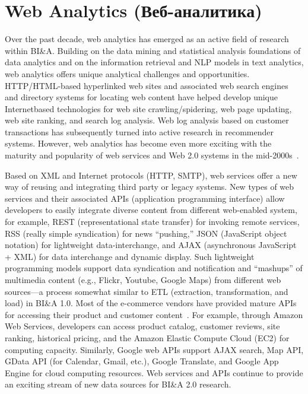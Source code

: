 \section{Web Analytics (Веб-аналитика)}

Over the past decade, web analytics has emerged as an active
field of research within BI\&A. Building on the data mining
and statistical analysis foundations of data analytics and on
the information retrieval and NLP models in text analytics,
web analytics offers unique analytical challenges and
opportunities. HTTP/HTML-based hyperlinked web sites and
associated web search engines and directory systems for
locating web content have helped develop unique Internetbased
technologies for web site crawling/spidering, web page
updating, web site ranking, and search log analysis. Web log
analysis based on customer transactions has subsequently
turned into active research in recommender systems. However,
web analytics has become even more exciting with the
maturity and popularity of web services and Web 2.0 systems
in the mid-2000s~\cite{OReilly:2005}. 

Based on XML and Internet protocols (HTTP, SMTP), web
services offer a new way of reusing and integrating third party
or legacy systems. New types of web services and their
associated APIs (application programming interface) allow
developers to easily integrate diverse content from different
web-enabled system, for example, REST (representational
state transfer) for invoking remote services, RSS (really
simple syndication) for news “pushing,” JSON (JavaScript
object notation) for lightweight data-interchange, and AJAX
(asynchronous JavaScript + XML) for data interchange and
dynamic display. Such lightweight programming models
support data syndication and notification and “mashups” of
multimedia content (e.g., Flickr, Youtube, Google Maps)
from different web sources—a process somewhat similar to
ETL (extraction, transformation, and load) in BI\&A 1.0.
Most of the e-commerce vendors have provided mature APIs
for accessing their product and customer content~\cite{Schonfeld:2005}. For example, through Amazon Web Services, developers
can access product catalog, customer reviews, site
ranking, historical pricing, and the Amazon Elastic Compute
Cloud (EC2) for computing capacity. Similarly, Google web
APIs support AJAX search, Map API, GData API (for
Calendar, Gmail, etc.), Google Translate, and Google App
Engine for cloud computing resources. Web services and
APIs continue to provide an exciting stream of new data
sources for BI\&A 2.0 research.

